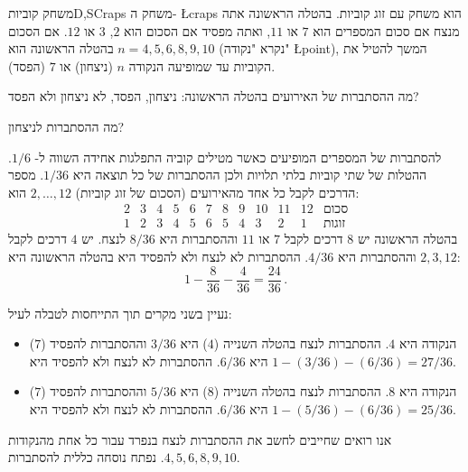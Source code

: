 
\begin{prob}{משחק קוביות}{D,S}{Craps}
משחק ה-%
\L{craps}
הוא משחק עם זוג קוביות. בהטלה הראשונה אתה מנצח אם סכום המספרים הוא
$7$
או
$11$,
ואתה מפסיד אם הסכום הוא
$2$, $3$
או
$12$.
אם הסכום בהטלה הראשונה הוא
$n=4,5,6,8,9,10$ 
(נקרא "נקודה" 
\L{point}),
המשך להטיל את הקוביות עד שמופיעה הנקודה 
$n$
(ניצחון) או 
$7$
(הפסד).

מה ההסתברות של האירועים בהטלה הראשונה: ניצחון, הפסד, לא ניצחון ולא הפסד?

מה ההסתברות לניצחון?
\end{prob}


להסתברות של המספרים המופיעים כאשר מטילים קוביה התפלגות אחידה השווה ל-%
$1/6$.
ההטלות של שתי קוביות בלתי תלויות ולכן ההסתברות של כל תוצאה היא 
$1/36$.
מספר הדרכים לקבל כל אחד מהאירועים (הסכום של זוג קוביות)
$2,\ldots,12$
הוא:
\[
\begin{array}{rrrrrrrrrrr|l}
2 & 3 & 4 & 5 & 6 & 7 & 8 & 9 & 10 & 11 & 12&\textrm{סכום}\\\hline
 1 & 2 & 3 & 4 & 5 & 6 & 5 & 4 & 3 & 2 & 1&\textrm{זוגות}
\end{array}
\]
בהטלה הראשונה יש 
$8$
דרכים לקבל
$7$
או
$11$
וההסתברות היא
$8/36$
לנצח. יש
$4$
דרכים לקבל
$2,3,12$
וההסתברות היא 
$4/36$.
ההסתברות לא לנצח ולא להפסיד היא בהטלה הראשונה היא:
\[
1 - \frac{8}{36} - \frac{4}{36} = \frac{24}{36}\,.
\]

נעיין בשני מקרים תוך התייחסות לטבלה לעיל:
\begin{itemize}
\item 
הנקודה היא
$4$.
ההסתברות לנצח בהטלה השנייה ($4$) היא
$3/36$
וההסתברות להפסיד ($7$) היא
$6/36$.
ההסתברות לא לנצח ולא להפסיד היא
$1-(3/36)-(6/36)=27/36$.

\item
הנקודה היא $8$. ההסתברות לנצח בהטלה השנייה ($8$) היא
$5/36$
וההסתברות להפסיד ($7$) היא
$6/36$.
ההסתברות לא לנצח ולא להפסיד היא
$1-(5/36)-(6/36)=25/36$.
\end{itemize}
אנו רואים שחייבים לחשב את ההסתברות לנצח בנפרד עבור כל אחת מהנקודות 
$4,5,6,8,9,10$.
נפתח נוסחה כללית להסתברות.

